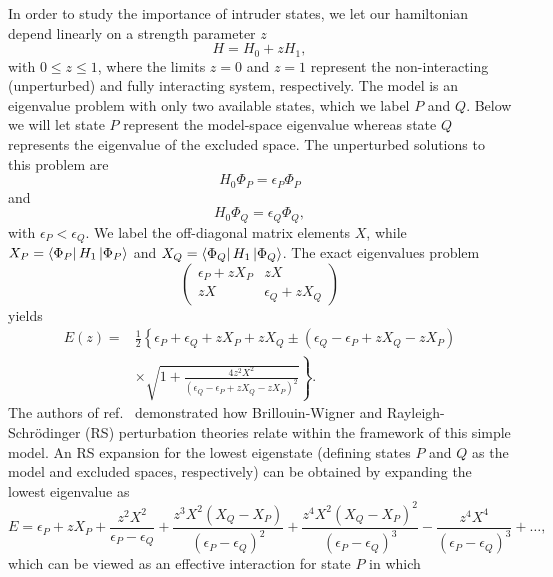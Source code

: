 In order to study the importance of intruder states, we let
our hamiltonian depend linearly on a strength parameter $z$
\[
       H=H_0+zH_1,
\]
with $0\leq z\leq1$, where the limits $z=0$ and $z=1$ represent the 
non-interacting (unperturbed) and fully interacting system, respectively.
The model is an eigenvalue
problem with only two available states, which we label
$P$ and $Q$. Below we will let 
state $P$ represent the model-space
eigenvalue whereas state $Q$ represents 
the eigenvalue of the excluded space.
The unperturbed solutions to this problem are
\begin{equation}
       H_0\Phi_P =\epsilon_P\Phi_P
\end{equation}
and
\begin{equation}
       H_0\Phi_Q =\epsilon_Q\Phi_Q,
\end{equation}
with $\epsilon_P < \epsilon_Q$. We label the off-diagonal
matrix elements $X$, while $X_P=\left\langle \Phi_P \right|H_1\left| \Phi_P \right\rangle$ and
$X_Q=\left\langle \Phi_Q \right|H_1\left| \Phi_Q \right\rangle$.
The exact eigenvalues problem
\begin{equation}
\left(\begin{array}{cc}\epsilon_P+zX_P &zX \\
zX &\epsilon_Q+zX_Q \end{array}\right)
\end{equation}
yields
\begin{eqnarray}
     \label{eq:exact}
     E(z)=&\frac{1}{2}\left\{\epsilon_P +\epsilon_Q +zX_P
     +zX_Q \pm \left(
     \epsilon_Q -\epsilon_P +zX_Q-zX_P\right) \right. \\ \nonumber
     & \left. \times\sqrt{1+\frac{4z^2X^2}{\left(
     \epsilon_Q -\epsilon_P +zX_Q-zX_P\right)^2}}
     \right\}.
\end{eqnarray}
The authors of ref.\ \cite{eo77}
demonstrated how Brillouin-Wigner and
Rayleigh-Schr\"{o}dinger (RS) perturbation theories relate
within the framework of this simple model.
An RS expansion for the lowest
eigenstate (defining states $P$ and $Q$ as the model and excluded
spaces, respectively) can be obtained by expanding the lowest
eigenvalue as
\begin{equation}
      E=\epsilon_P +zX_P+\frac{z^2X^2}{\epsilon_P -\epsilon_Q}+
      \frac{z^3X^2(X_Q-X_P)}{(\epsilon_P -\epsilon_Q)^2}+
      \frac{z^4X^2(X_Q-X_P)^2}{(\epsilon_P -\epsilon_Q)^3}
      -\frac{z^4X^4}{(\epsilon_P -\epsilon_Q)^3}+\dots,
      \label{eq:modela}
\end{equation}
which can be viewed as an effective interaction for state $P$ in which
